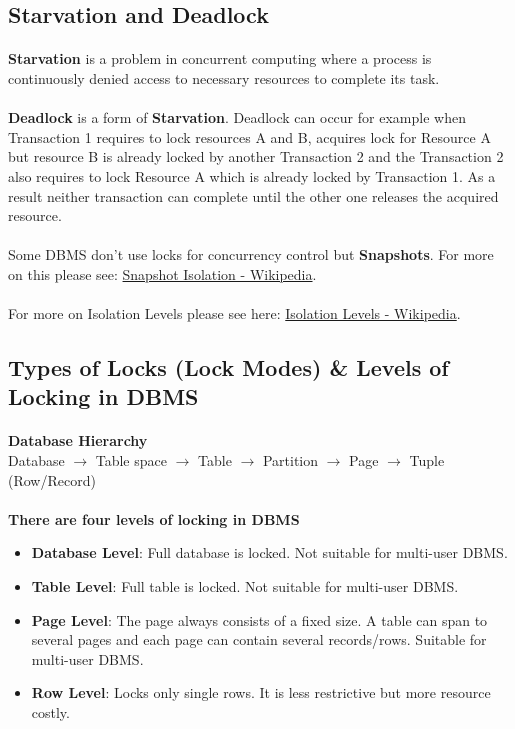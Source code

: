 \subsection{Starvation and Deadlock}
\paragraph{} \textbf{Starvation} is a problem in concurrent computing where a process is continuously denied access to necessary resources to complete its task.
\paragraph{} \textbf{Deadlock} is a form of \textbf{Starvation}. Deadlock can occur for example when Transaction 1 requires to lock resources A and B, acquires lock for Resource A but resource B is already locked by another Transaction 2 and the Transaction 2 also requires to lock Resource A which is already locked by Transaction 1. As a result neither transaction can complete until the other one releases the acquired resource.
\paragraph{} Some \acs{DBMS} don't use locks for concurrency control but \textbf{Snapshots}. For more on this please see: \href{https://en.wikipedia.org/wiki/Snapshot_isolation}{Snapshot Isolation - Wikipedia}.
\paragraph{} For more on Isolation Levels please see here: \href{https://en.wikipedia.org/wiki/Isolation_(database_systems)}{Isolation Levels - Wikipedia}.
\subsection{Types of Locks (Lock Modes) \& Levels of Locking in \acs{DBMS}}
\paragraph{} \textbf{Database Hierarchy}\\Database $\rightarrow$ Table space $\rightarrow$ Table $\rightarrow$ Partition $\rightarrow$ Page $\rightarrow$ Tuple (Row/Record)
\paragraph{} \textbf{There are four levels of locking in \acs{DBMS}}
\begin{itemize}
	\item \textbf{Database Level}: Full database is locked. Not suitable for multi-user \acs{DBMS}.
	\item \textbf{Table Level}: Full table is locked. Not suitable for multi-user \acs{DBMS}.
	\item \textbf{Page Level}: The page always consists of a fixed size. A table can span to several pages and each page can contain several records/rows. Suitable for multi-user \acs{DBMS}.
	\item \textbf{Row Level}: Locks only single rows. It is less restrictive but more resource costly.
\end{itemize}
